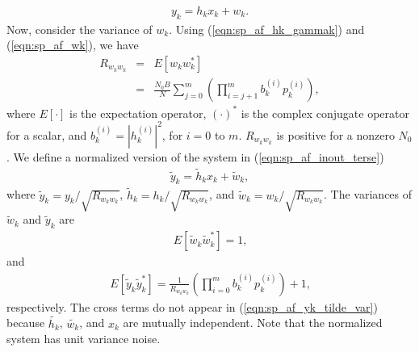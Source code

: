 \documentclass[journal]{IEEEtran}
\begin{document}
\begin{eqnarray}
y_k = h_k x_k + w_k \mbox{.} \label{eqn:sp_af_inout_terse}
\end{eqnarray}
Now, consider the variance of $w_k$.  Using
(\ref{eqn:sp_af_hk_gammak}) and (\ref{eqn:sp_af_wk}), we have
\begin{eqnarray}
R_{w_kw_k} & = & E \left[ w_k w_k^* \right] \nonumber \\  & = &
\frac{N_0B}{N} \sum_{j=0}^{m} \left( \prod_{i=j+1}^mb_k^{(i)}
p_k^{(i)}  \right) , \label{eqn:sp_af_Rwkwk}
\end{eqnarray}
where $E\left[ \cdot \right]$ is the expectation operator,
$\left(\cdot\right)^*$ is the complex conjugate operator for a
scalar, and $b_k^{(i)} = \left| h_k^{(i)} \right|^2$, for $i=0$ to
$m$.  $R_{w_kw_k}$ is positive for a nonzero $N_0$.  We define a
normalized version of the system in (\ref{eqn:sp_af_inout_terse})
\begin{eqnarray}
\tilde{y}_k = \tilde{h}_k x_k + \tilde{w}_k,
\end{eqnarray}
where $\tilde{y}_k = y_k / \sqrt{R_{w_kw_k}}$, $\tilde{h}_k = h_k
/ \sqrt{R_{w_kw_k}}$, and $\tilde{w}_k = w_k / \sqrt{R_{w_kw_k}}$.
The variances of $\tilde{w}_k$ and $\tilde{y}_k$ are
\begin{eqnarray}
E \left[ \tilde{w}_k \tilde{w}_k^* \right] = 1 \mbox{,}
\end{eqnarray}
and
\begin{eqnarray}
E \left[ \tilde{y}_k \tilde{y}_k^* \right] = \frac{1}{R_{w_kw_k}}
\left( \prod_{i=0}^m b_k^{(i)} p_k^{(i)} \right) + 1
\label{eqn:sp_af_yk_tilde_var} \mbox{,}
\end{eqnarray}
respectively.  The cross terms do not appear in
(\ref{eqn:sp_af_yk_tilde_var}) because $\tilde{h_k}$,
$\tilde{w_k}$, and $x_k$ are mutually independent.  Note that the
normalized system has unit variance noise.
\end{document}

